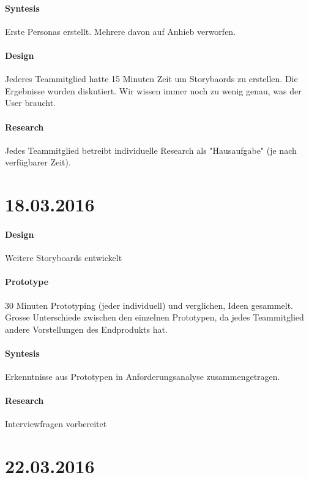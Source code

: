 \documentclass[a4paper]{scrreprt}
\begin{document}
\paragraph{Syntesis}
Erste Personas erstellt. Mehrere davon auf Anhieb verworfen.


\paragraph{Design}
Jederes Teammitglied hatte 15 Minuten Zeit um Storybaords zu erstellen. Die Ergebnisse wurden diskutiert. Wir wissen immer noch zu wenig genau, was der User braucht.

\paragraph{Research}
Jedes Teammitglied betreibt individuelle Research als "Hausaufgabe" (je nach verfügbarer Zeit).




\section*{18.03.2016}
\paragraph{Design}
Weitere Storyboards entwickelt


\paragraph{Prototype}
30 Minuten Prototyping (jeder individuell) und verglichen, Ideen gesammelt. Grosse Unterschiede zwischen den einzelnen Prototypen, da jedes Teammitglied andere Vorstellungen des Endprodukts hat.


\paragraph{Syntesis}
Erkenntnisse aus Prototypen in Anforderungsanalyse zusammengetragen.



\paragraph{Research}
Interviewfragen vorbereitet



\section*{22.03.2016}
\end{document}
